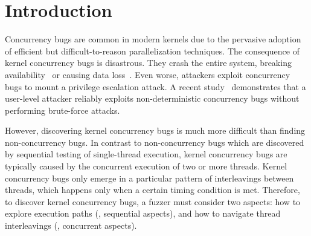 \section{Introduction}
\label{s:intro}


Concurrency bugs are common in modern kernels due to 
the pervasive adoption of efficient but difficult-to-reason
parallelization techniques.
The consequence of kernel concurrency bugs is disastrous. They crash
the entire system, breaking availability~\cite{cve201812232, snowboardbug} or causing data loss~\cite{dataloss}.
Even worse, attackers 
exploit concurrency bugs to mount a privilege escalation attack.
A recent study~\cite{exprace} demonstrates that a user-level attacker 
reliably exploits non-deterministic concurrency bugs without performing
brute-force attacks.

However, discovering kernel concurrency bugs is much more difficult than 
finding non-concurrency bugs. 
In contrast to non-concurrency bugs which are discovered by 
sequential testing of single-thread execution,
kernel concurrency bugs are typically caused by the concurrent execution 
of two or more threads. 
Kernel concurrency bugs only emerge in a particular pattern of 
interleavings between threads, which happens only when a certain timing condition is met.
%
Therefore, to discover kernel concurrency bugs, a fuzzer must consider
two aspects: how to explore execution paths (\ie, sequential aspects),
and how to navigate thread interleavings (\ie, concurrent aspects).

%




